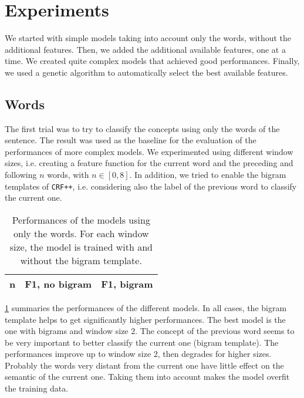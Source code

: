 \section{Experiments}
\label{sec:experiments}
We started with simple models taking into account only the words, without the additional features.
Then, we added the additional available features, one at a time.
We created quite complex models that achieved good performances.
Finally, we used a genetic algorithm to automatically select the best available features.

\subsection{Words}
\label{subsection:words}
The first trial was to try to classify the concepts using only the words of the sentence.
The result was used as the baseline for the evaluation of the performances of more complex models.
We experimented using different window sizes, i.e. creating a feature function for the current word and the preceding and following $n$ words, with $n \in [0,8]$.
In addition, we tried to enable the bigram templates of \texttt{CRF++}, i.e. considering also the label of the previous word to classify the current one. 

\begin{table}[h]
	\centering
    \begin{tabular}{ c c c }
    	\toprule
    		\multicolumn{1}{c}{n} & \multicolumn{1}{c}{F1, no bigram} & \multicolumn{1}{c}{F1, bigram} \\
    	\midrule
            
    	\bottomrule
	\end{tabular}
    \caption{Performances of the models using only the words. For each window size, the model is trained with and without the bigram template.}
	\label{tab:words}
\end{table}

\cref{tab:words} summaries the performances of the different models.
In all cases, the bigram template helps to get significantly higher performances.
The best model is the one with bigrams and window size $2$.
The concept of the previous word seems to be very important to better classify the current one (bigram template).
The performances improve up to window size $2$, then degrades for higher sizes.
Probably the words very distant from the current one have little effect on the semantic of the current one.
Taking them into account makes the model overfit the training data.

